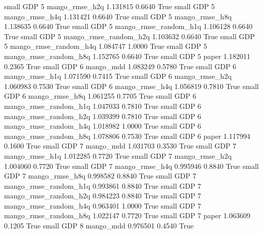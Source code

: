      small      GDP                 5        mango_rmse_h2q   1.131815      0.6640    True
     small      GDP                 5        mango_rmse_h4q   1.131421      0.6640    True
     small      GDP                 5        mango_rmse_h8q   1.138635      0.6640    True
     small      GDP                 5 mango_rmse_random_h1q   1.106128      0.6640    True
     small      GDP                 5 mango_rmse_random_h2q   1.103632      0.6640    True
     small      GDP                 5 mango_rmse_random_h4q   1.084747      1.0000    True
     small      GDP                 5 mango_rmse_random_h8q   1.152765      0.6640    True
     small      GDP                 5                 paper   1.182011      0.2365    True
     small      GDP                 6             mango_mdd   1.083249      0.5780    True
     small      GDP                 6        mango_rmse_h1q   1.071590      0.7415    True
     small      GDP                 6        mango_rmse_h2q   1.060983      0.7530    True
     small      GDP                 6        mango_rmse_h4q   1.056819      0.7810    True
     small      GDP                 6        mango_rmse_h8q   1.061255      0.7705    True
     small      GDP                 6 mango_rmse_random_h1q   1.047033      0.7810    True
     small      GDP                 6 mango_rmse_random_h2q   1.039399      0.7810    True
     small      GDP                 6 mango_rmse_random_h4q   1.018982      1.0000    True
     small      GDP                 6 mango_rmse_random_h8q   1.078806      0.7530    True
     small      GDP                 6                 paper   1.117994      0.1600    True
     small      GDP                 7             mango_mdd   1.031703      0.3530    True
     small      GDP                 7        mango_rmse_h1q   1.012285      0.7720    True
     small      GDP                 7        mango_rmse_h2q   1.004060      0.7720    True
     small      GDP                 7        mango_rmse_h4q   0.995946      0.8840    True
     small      GDP                 7        mango_rmse_h8q   0.998582      0.8840    True
     small      GDP                 7 mango_rmse_random_h1q   0.993861      0.8840    True
     small      GDP                 7 mango_rmse_random_h2q   0.984223      0.8840    True
     small      GDP                 7 mango_rmse_random_h4q   0.963401      1.0000    True
     small      GDP                 7 mango_rmse_random_h8q   1.022147      0.7720    True
     small      GDP                 7                 paper   1.063609      0.1205    True
     small      GDP                 8             mango_mdd   0.976501      0.4540    True
